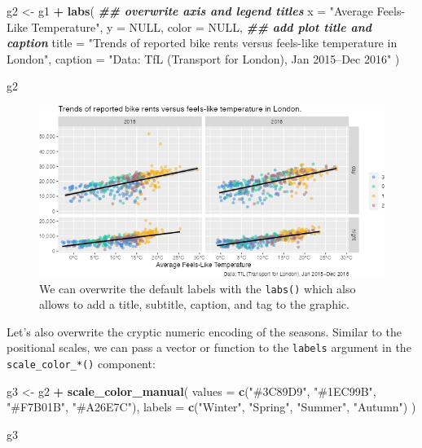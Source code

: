 \documentclass[
]{krantz}
\makeatletter
\newenvironment{Shaded}{\begin{snugshade}}{\end{snugshade}}
\newcommand{\AttributeTok}[1]{\textcolor[rgb]{0.27,0.27,0.27}{#1}}
\newcommand{\ConstantTok}[1]{\textcolor[rgb]{0.37,0.37,0.37}{#1}}
\newcommand{\DocumentationTok}[1]{\textcolor[rgb]{0.37,0.37,0.37}{\textbf{\textit{#1}}}}
\newcommand{\FunctionTok}[1]{\textcolor[rgb]{0.27,0.27,0.27}{\textbf{#1}}}
\newcommand{\NormalTok}[1]{#1}
\newcommand{\OtherTok}[1]{\textcolor[rgb]{0.37,0.37,0.37}{#1}}
\newcommand{\SpecialCharTok}[1]{\textcolor[rgb]{0.43,0.43,0.43}{\textbf{#1}}}
\newcommand{\StringTok}[1]{\textcolor[rgb]{0.5,0.5,0.5}{#1}}
\newenvironment{kframe}{%
\medskip{}
\setlength{\fboxsep}{.8em}
 \def\at@end@of@kframe{}%
 \ifinner\ifhmode%
  \def\at@end@of@kframe{\end{minipage}}%
  \begin{minipage}{\columnwidth}%
 \fi\fi%
 \def\FrameCommand##1{\hskip\@totalleftmargin \hskip-\fboxsep
 \colorbox{shadecolor}{##1}\hskip-\fboxsep
     \hskip-\linewidth \hskip-\@totalleftmargin \hskip\columnwidth}%
 \MakeFramed {\advance\hsize-\width
   \@totalleftmargin\z@ \linewidth\hsize
   \@setminipage}}%
 {\par\unskip\endMakeFramed%
 \at@end@of@kframe}
\renewenvironment{Shaded}{\begin{kframe}}{\end{kframe}}
\makeatother
\begin{document}
\begin{Shaded}
\begin{Highlighting}[]
\NormalTok{g2 }\OtherTok{\textless{}{-}}\NormalTok{ g1 }\SpecialCharTok{+}
  \FunctionTok{labs}\NormalTok{(}
    \DocumentationTok{\#\# overwrite axis and legend titles}
    \AttributeTok{x =} \StringTok{"Average Feels{-}Like Temperature"}\NormalTok{, }\AttributeTok{y =} \ConstantTok{NULL}\NormalTok{, }\AttributeTok{color =} \ConstantTok{NULL}\NormalTok{,}
    \DocumentationTok{\#\# add plot title and caption}
    \AttributeTok{title =} \StringTok{"Trends of reported bike rents versus feels{-}like temperature in London"}\NormalTok{,}
    \AttributeTok{caption =} \StringTok{"Data: TfL (Transport for London), Jan 2015–Dec 2016"}
\NormalTok{  )}

\NormalTok{g2}
\end{Highlighting}
\end{Shaded}

\begin{figure}
\centering
\includegraphics{bookdown_files/figure-latex/04ggplotLabels-1.png}
\caption{\label{fig:04ggplotLabels}We can overwrite the default labels with the \texttt{labs()} which also allows to add a title, subtitle, caption, and tag to the graphic.}
\end{figure}

Let's also overwrite the cryptic numeric encoding of the seasons. Similar to the positional scales, we can pass a vector or function to the \texttt{labels} argument in the \texttt{scale\_color\_*()} component:

\begin{Shaded}
\begin{Highlighting}[]
\NormalTok{g3 }\OtherTok{\textless{}{-}}\NormalTok{ g2 }\SpecialCharTok{+}
  \FunctionTok{scale\_color\_manual}\NormalTok{(}
    \AttributeTok{values =} \FunctionTok{c}\NormalTok{(}\StringTok{"\#3C89D9"}\NormalTok{, }\StringTok{"\#1EC99B"}\NormalTok{, }\StringTok{"\#F7B01B"}\NormalTok{, }\StringTok{"\#A26E7C"}\NormalTok{),}
    \AttributeTok{labels =} \FunctionTok{c}\NormalTok{(}\StringTok{"Winter"}\NormalTok{, }\StringTok{"Spring"}\NormalTok{, }\StringTok{"Summer"}\NormalTok{, }\StringTok{"Autumn"}\NormalTok{)}
\NormalTok{  )}

\NormalTok{g3}
\end{Highlighting}
\end{Shaded}
\end{document}
